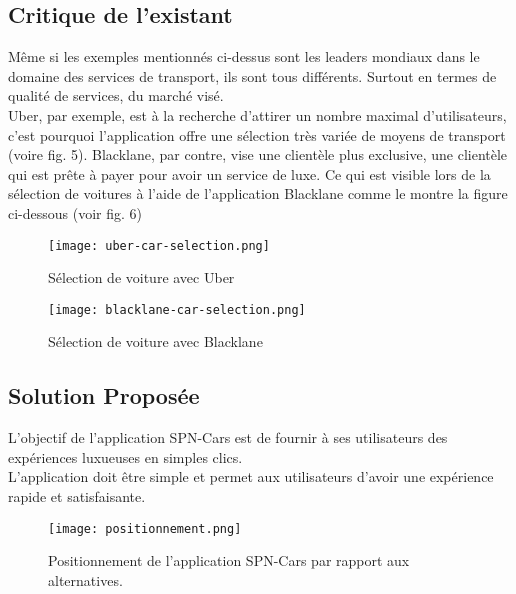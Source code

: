 \subsection{Critique de l'existant}
Même si les exemples mentionnés ci-dessus sont les leaders mondiaux dans le domaine des services de transport, ils sont tous différents. Surtout en termes de qualité de services, du marché visé.\\
\noindent Uber, par exemple, est à la recherche d'attirer un nombre maximal d'utilisateurs, c'est pourquoi l'application offre une sélection très variée de moyens de transport (voire fig. 5). Blacklane, par contre, vise une clientèle plus exclusive, une clientèle qui est prête à payer pour avoir un service de luxe. Ce qui est visible lors de la sélection de voitures à l'aide de l'application Blacklane comme le montre la figure ci-dessous (voir fig. 6)
\vspace{1cm}
\clearpage
\begin{multicols}{2}
    \begin{figure}[H]
        \centering
        \texttt{[image: uber-car-selection.png]}
        \vspace{1cm}
        \captionsetup{justification=centering}
        \caption{Sélection de voiture avec Uber}
        \label{fig:uber_selection}
    \end{figure}
    \begin{figure}[H]
        \centering
        \texttt{[image: blacklane-car-selection.png]}
        \vspace{1cm}
        \captionsetup{justification=centering}
        \caption{Sélection de voiture avec Blacklane}
        \label{fig:blacklane_selection}
    \end{figure}
\end{multicols}
\subsection{Solution Proposée}
L'objectif de l'application SPN-Cars est de fournir à ses utilisateurs des expériences luxueuses en simples clics.\\
L'application doit être simple et permet aux utilisateurs d'avoir une expérience rapide et satisfaisante.
\begin{figure}[H]
    \centering
    \texttt{[image: positionnement.png]}
    \vspace{1cm}
    \caption{Positionnement de l'application SPN-Cars par rapport aux alternatives.}
    \label{fig:positionnement_marche}
\end{figure}
